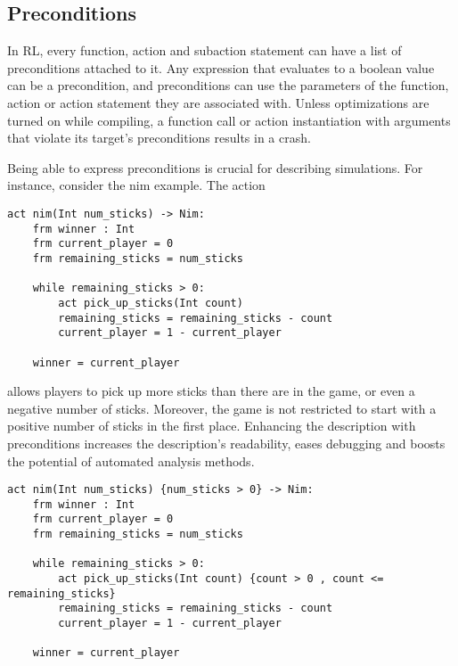\subsection{Preconditions}
In RL, every function, action and subaction statement can have a list of preconditions attached to it.
Any expression that evaluates to a boolean value can be a precondition, and preconditions can use the parameters of the function, action or action statement they are associated with.
Unless optimizations are turned on while compiling, a function call or action instantiation with arguments that violate its target's preconditions results in a crash.

Being able to express preconditions is crucial for describing simulations.
For instance, consider the nim example. The action 
\begin{lstlisting}
act nim(Int num_sticks) -> Nim:
    frm winner : Int
    frm current_player = 0
    frm remaining_sticks = num_sticks

    while remaining_sticks > 0:
        act pick_up_sticks(Int count)
        remaining_sticks = remaining_sticks - count
        current_player = 1 - current_player

    winner = current_player
\end{lstlisting}
allows players to pick up more sticks than there are in the game, or even a negative number of sticks.
Moreover, the game is not restricted to start with a positive number of sticks in the first place.
Enhancing the description with preconditions increases the description's readability, eases debugging and boosts the potential of automated analysis methods.
\begin{lstlisting}
act nim(Int num_sticks) {num_sticks > 0} -> Nim:
    frm winner : Int
    frm current_player = 0
    frm remaining_sticks = num_sticks

    while remaining_sticks > 0:
        act pick_up_sticks(Int count) {count > 0 , count <= remaining_sticks}
        remaining_sticks = remaining_sticks - count
        current_player = 1 - current_player

    winner = current_player
\end{lstlisting}
